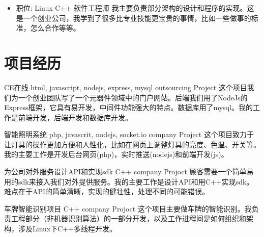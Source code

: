 \documentclass[11pt,a4paper]{moderncv}
\begin{document}
{
\begin{itemize}
\item 职位: Linux C++ 软件工程师
我主要负责部分架构的设计和程序的实现。这是一个创业公司，我学到了很多比专业技能更宝贵的事情，比如一些做事的标准，怎么合作等等。
\end{itemize}
}


\section{项目经历}
{CE在线}
{html, javascript, nodejs, express, mysql}
{outsourcing Project}
{}
{
这个项目我们为一个创业团队写了一个元器件领域中的门户网站。后端我们用了NodeJs的Express框架，它具有易开发，中间件功能强大的特点。数据库用了mysql。我的工作是前端开发，后端开发和数据库开发。\\
}

\vspace*{0.2\baselineskip}
{智能照明系统}
{php, javascrit, nodejs, socket.io}
{company Project}
{}
{
这个项目致力于让灯具的操作更加方便和人性化，比如在网页上调整灯具的亮度、色温、开关等。我的主要工作是开发后台网页(php)，实时推送(nodejs)和前端开发(js)。\\
}

\vspace*{0.2\baselineskip}
{为公司对外服务设计API和实现sdk}
{C++}
{company Projoct}
{}
{
顾客需要一个简单易用的sdk来接入我们对外提供服务。我的主要工作是设计API和用C++实现sdk。难点在于API的简单清晰，实现的健壮性，处理不同的可能错误。\\
}

\vspace*{0.2\baselineskip}
{车牌智能识别项目}
{C++}
{company Projoct}
{}
{
这个项目主要做车牌的智能识别。我负责工程部分（非机器识别算法）的一部分开发，以及工作进程间是如何组织和架构，涉及Linux下C++多线程开发。\\
}

\end{document}
